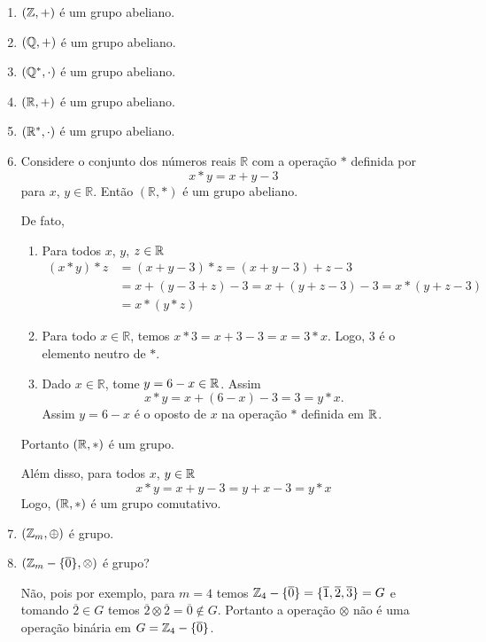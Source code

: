 \begin{exemplos}
	\begin{enumerate}[label={\arabic*})]
		\item $(\mathbb{Z},+)$ {\'e} um grupo abeliano.
		\item $(\mathbb{Q},+)$ {\'e} um grupo abeliano.
		\item $(\mathbb{Q}^*,\cdot)$ {\'e} um grupo abeliano.
		\item $(\mathbb{R},+)$ {\'e} um grupo abeliano.
		\item $(\mathbb{R}^*,\cdot)$ {\'e} um grupo abeliano.
		\item Considere o conjunto dos n{\'u}meros reais $\mathbb{R}$ com a opera{\c c}{\~a}o $*$ definida por
		\[
			x*y = x + y - 3
		\]
		para $x$, $y \in \mathbb{R}$. Ent{\~a}o $(\mathbb{R}, *)$ {\'e} um grupo abeliano.
		\begin{solucao}
			De fato,
			\begin{enumerate}[label={\roman*})]
				\item Para todos $x$, $y$, $z \in \mathbb{R}$
				\begin{align*}
					(x*y)*z &= (x+y-3)*z = (x+y-3)+z-3\\
					&= x+(y-3+z)-3 = x+(y+z-3)-3 = x*(y+z-3)\\
					&= x*(y*z)
				\end{align*}

				\item Para todo $x \in \mathbb{R}$, temos $x*3 = x + 3 - 3 = x = 3 * x$. Logo, 3 {\'e} o elemento neutro de $*$.

				\item Dado $x \in \mathbb{R}$, tome $y = 6 - x \in \mathbb{R}$. Assim
				\[
					x*y = x + (6-x)-3 = 3 = y*x.
				\]
				Assim $y = 6 - x$ \'e o oposto de $x$ na opera\c{c}\~ao $*$ definida em $\mathbb{R}$.
			\end{enumerate}

			Portanto $(\mathbb{R}, *)$ \'e um grupo.

			Al\'em disso, para todos $x$, $y \in \mathbb{R}$
			\[
				x*y = x + y - 3 = y + x - 3 = y*x
			\]
			Logo, $(\mathbb{R}, *)$ {\'e} um grupo comutativo.
		\end{solucao}

		\item $(\mathbb{Z}_m,\oplus)$ {\'e} grupo.

		\item $(\mathbb{Z}_m-\{\overline{0}\},\otimes)$ {\'e} grupo?
		\begin{solucao}
			N\~ao, pois por exemplo, para $m = 4$ temos $\mathbb{Z}_4-\{\overline{0}\} = \{\overline{1}, \overline{2}, \overline{3}\} = G$ e tomando $\overline{2}\in G$ temos $\overline{2} \otimes \overline{2} = \overline{0} \notin G$. Portanto a opera\c{c}\~ao $\otimes$ n\~ao \'e uma opera\c{c}\~ao bin\'aria em $G = \mathbb{Z}_4 - \{\overline{0}\}$.
		\end{solucao}
	\end{enumerate}
\end{exemplos}

